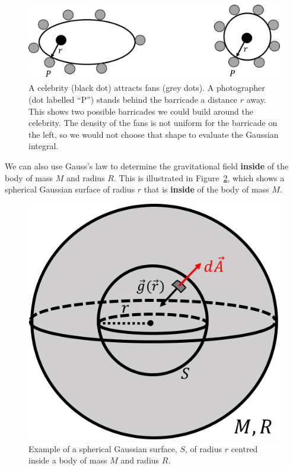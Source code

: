 \begin{framed}
\begin{figure}[!htbp]
\centering
\includegraphics[width=0.7\linewidth]{files/barricadeanalogy-98ef92293c7c725259688fc9eacd1a31.png}
\caption[]{A celebrity (black dot) attracts fans (grey dots). A photographer (dot labelled ``P'') stands behind the barricade a distance $r$ away. This shows two possible barricades we could build around the celebrity. The density of the fans is not uniform for the barricade on the left, so we would not choose that shape to evaluate the Gaussian integral.}
\label{fig:gravity:barricadeanalogy}
\end{figure}
\end{framed}

We can also use Gauss's law to determine the gravitational field \textbf{inside} of the body of mass $M$ and radius $R$. This is illustrated in Figure~\ref{fig:gravity:gauss2}, which shows a spherical Gaussian surface of radius $r$ that is \textbf{inside} of the body of mass $M$.

\begin{figure}[!htbp]
\centering
\includegraphics[width=0.3\linewidth]{files/gauss2-3bcc1d70b85158fced3e532072fa9bf9.png}
\caption[]{Example of a spherical Gaussian surface, $S$, of radius $r$ centred inside a body of mass $M$ and radius $R$.}
\label{fig:gravity:gauss2}
\end{figure}

